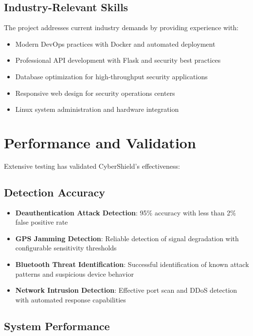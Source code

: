 \documentclass[12pt,a4paper]{report}
\begin{document}
\subsection{Industry-Relevant Skills}

The project addresses current industry demands by providing experience with:
\begin{itemize}
    \item Modern DevOps practices with Docker and automated deployment
    \item Professional API development with Flask and security best practices
    \item Database optimization for high-throughput security applications
    \item Responsive web design for security operations centers
    \item Linux system administration and hardware integration
\end{itemize}

\section{Performance and Validation}

Extensive testing has validated CyberShield's effectiveness:

\subsection{Detection Accuracy}

\begin{itemize}
    \item \textbf{Deauthentication Attack Detection}: 95\% accuracy with less than 2\% false positive rate
    \item \textbf{GPS Jamming Detection}: Reliable detection of signal degradation with configurable sensitivity thresholds
    \item \textbf{Bluetooth Threat Identification}: Successful identification of known attack patterns and suspicious device behavior
    \item \textbf{Network Intrusion Detection}: Effective port scan and DDoS detection with automated response capabilities
\end{itemize}

\subsection{System Performance}
\end{document}
